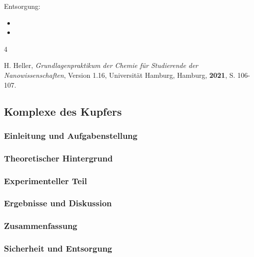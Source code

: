 \documentclass[
	a4paper,										%
	12pt,											%
	twoside,										%
	headsepline,								%
	footsepline,									%
	captions=tableheading,					%
]{scrartcl}
\begin{document}
Entsorgung: \\
\begin{itemize}
    \item[(1)] 
    \item[(2)] 
\end{itemize}	

\newpage

\begin{thebibliography}{4}		%

						{H. Heller}, 
			\textit	{Grundlagenpraktikum der Chemie für Studierende der Nanowissenschaften}, 
						{Version 1.16}, 
						{Universität Hamburg}, 
						{Hamburg}, 
			\textbf	{2021}, 
			S.			{106-107}.
			
\end{thebibliography}

\newpage

\setcounter{subsection}{2}							%
\setcounter{secnumdepth}{4}
	
\subsection{Komplexe des Kupfers}

\subsubsection{Einleitung und Aufgabenstellung}

\subsubsection{Theoretischer Hintergrund}

\subsubsection{Experimenteller Teil}

\subsubsection{Ergebnisse und Diskussion}

\subsubsection{Zusammenfassung}

\subsubsection{Sicherheit und Entsorgung}
		
\end{document}
